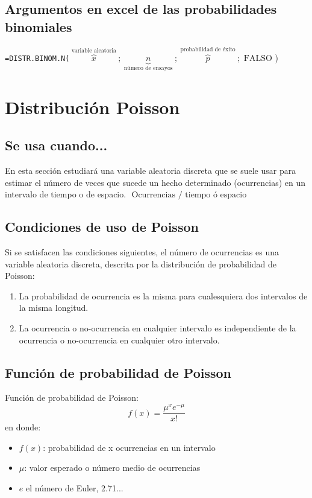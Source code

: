 \documentclass{article}
\begin{document}
\subsection{Argumentos en excel de las probabilidades binomiales}
\begin{center}
    \verb|=DISTR.BINOM.N(|$\displaystyle \overbrace{x}^{\text{ variable aleatoria }};\underbrace{n}_{\text{ número de ensayos }};\overbrace{p}^{\text{ probabilidad de éxito }};\text{ FALSO }$)
\end{center}



\hrulefill
\section{Distribución Poisson}
\subsection{Se usa cuando...}
En esta sección estudiará una variable aleatoria discreta que se suele usar para estimar el número de veces que sucede un hecho determinado (ocurrencias) en un intervalo de tiempo o de espacio. $\displaystyle \text{ Ocurrencias }/ \text{ tiempo ó espacio }$

\subsection{Condiciones de uso de Poisson}
Si se satisfacen las condiciones siguientes, el número de ocurrencias es una variable aleatoria discreta, descrita por la distribución de probabilidad de Poisson:
\begin{enumerate}
    \item La probabilidad de ocurrencia es la misma para cualesquiera dos intervalos de la misma longitud. 
    \item La ocurrencia o no-ocurrencia en cualquier intervalo es independiente de la ocurrencia o no-ocurrencia en cualquier otro intervalo. 
\end{enumerate}
    
\subsection{Función de probabilidad de Poisson}
Función de probabilidad de Poisson:
\[
    f(x) = \frac{\mu ^x e ^{-\mu}}{x!}     
\] en donde:
\begin{itemize}
    \item $f(x)$: probabilidad de x ocurrencias en un intervalo 
    \item $\mu$: valor esperado o número medio de ocurrencias 
    \item $e$ el número de Euler, 2.71...
\end{itemize}
\end{document}
